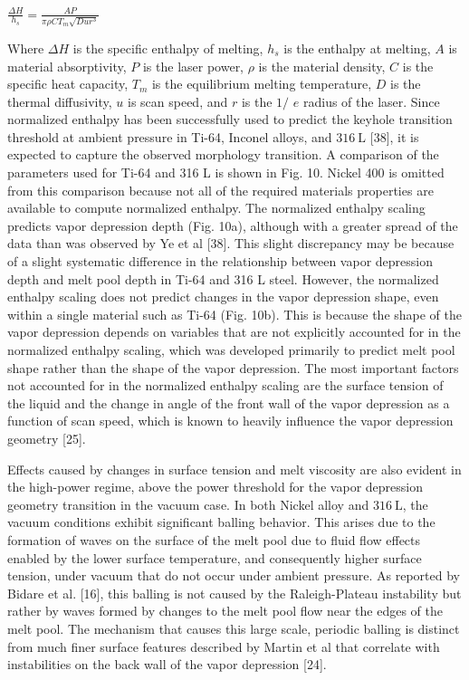 \documentclass[10pt]{article}
\begin{document}
$\frac{\Delta H}{h_{s}}=\frac{A P}{\pi \rho C T_{m} \sqrt{D u r^{3}}}$

Where $\Delta H$ is the specific enthalpy of melting, $h_{s}$ is the enthalpy at melting, $A$ is material absorptivity, $P$ is the laser power, $\rho$ is the material density, $C$ is the specific heat capacity, $T_{m}$ is the equilibrium melting temperature, $D$ is the thermal diffusivity, $u$ is scan speed, and $r$ is the $1 /$ $e$ radius of the laser. Since normalized enthalpy has been successfully used to predict the keyhole transition threshold at ambient pressure in Ti-64, Inconel alloys, and $316 \mathrm{~L}$ [38], it is expected to capture the observed morphology transition. A comparison of the parameters used for Ti-64 and 316 L is shown in Fig. 10. Nickel 400 is omitted from this comparison because not all of the required materials properties are available to compute normalized enthalpy. The normalized enthalpy scaling predicts vapor depression depth (Fig. 10a), although with a greater spread of the data than was observed by Ye et al [38]. This slight discrepancy may be because of a slight systematic difference in the relationship between vapor depression depth and melt pool depth in Ti-64 and 316 L steel. However, the normalized enthalpy scaling does not predict changes in the vapor depression shape, even within a single material such as Ti-64 (Fig. 10b). This is because the shape of the vapor depression depends on variables that are not explicitly accounted for in the normalized enthalpy scaling, which was developed primarily to predict melt pool shape rather than the shape of the vapor depression. The most important factors not accounted for in the normalized enthalpy scaling are the surface tension of the liquid and the change in angle of the front wall of the vapor depression as a function of scan speed, which is known to heavily influence the vapor depression\\
geometry [25].

Effects caused by changes in surface tension and melt viscosity are also evident in the high-power regime, above the power threshold for the vapor depression geometry transition in the vacuum case. In both Nickel alloy and $316 \mathrm{~L}$, the vacuum conditions exhibit significant balling behavior. This arises due to the formation of waves on the surface of the melt pool due to fluid flow effects enabled by the lower surface temperature, and consequently higher surface tension, under vacuum that do not occur under ambient pressure. As reported by Bidare et al. [16], this balling is not caused by the Raleigh-Plateau instability but rather by waves formed by changes to the melt pool flow near the edges of the melt pool. The mechanism that causes this large scale, periodic balling is distinct from much finer surface features described by Martin et al that correlate with instabilities on the back wall of the vapor depression [24].
\end{document}
